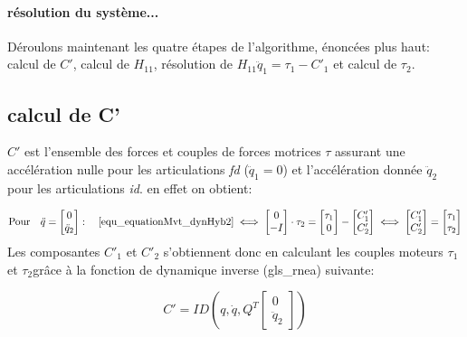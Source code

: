 \documentclass{report}
\begin{document}
\paragraph{résolution du système...}
Déroulons maintenant les quatre étapes de l'algorithme, énoncées plus haut: calcul de $C'$, calcul de $H_{11}$, résolution de $H_{11} \ddot{q}_1 = \tau_1 - C'_1$ et calcul de $\tau_2$.


\subsection{calcul de C'}

$C'$ est l'ensemble des forces et couples de forces motrices $\tau$ assurant une accélération nulle pour les articulations \emph{fd} ($\ddot{q}_1=0$) et l'accélération donnée $\ddot{q}_2$ pour les articulations \emph{id}. en effet on obtient:

\begin{equation}
\textnormal{Pour} \quad \ddot{q}=
\begin{bmatrix}
  0 \\
  \ddot{q}_2
\end{bmatrix}
: \quad
\eqref{equ_equationMvt_dynHyb2} \iff
\begin{bmatrix}
  0 \\
  -I
\end{bmatrix} 
\cdot \tau_2
=
\begin{bmatrix}
  \tau_1 \\
  0
\end{bmatrix} 
-
\begin{bmatrix}
  C'_1 \\
  C'_2
\end{bmatrix}
\iff
\begin{bmatrix}
  C'_1 \\
  C'_2
\end{bmatrix}
=
\begin{bmatrix}
  \tau_1 \\
  \tau_2
\end{bmatrix} 
\end{equation}
\medskip
Les composantes $C'_1$ et $C'_2$ s'obtiennent donc en calculant les couples moteurs $\tau_1$ et $\tau_2$\footnotemark[2]grâce à la fonction de dynamique inverse (\gls{gls_rnea}) suivante:

\begin{equation}
C'=ID \left( q,\dot{q},Q^T
\begin{bmatrix}
  0 \\
  \ddot{q}_2
\end{bmatrix} \right)
\end{equation}
\end{document}

